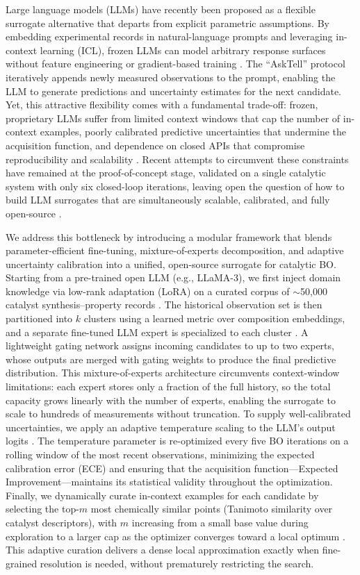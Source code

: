 \documentclass{article}
\begin{document}
Large language models (LLMs) have recently been proposed as a flexible surrogate alternative that departs from explicit parametric assumptions. By embedding experimental records in natural-language prompts and leveraging in-context learning (ICL), frozen LLMs can model arbitrary response surfaces without feature engineering or gradient-based training \cite{boiko2023autonomous, asktell2023llm}. The “AskTell” protocol iteratively appends newly measured observations to the prompt, enabling the LLM to generate predictions and uncertainty estimates for the next candidate. Yet, this attractive flexibility comes with a fundamental trade-off: frozen, proprietary LLMs suffer from limited context windows that cap the number of in-context examples, poorly calibrated predictive uncertainties that undermine the acquisition function, and dependence on closed APIs that compromise reproducibility and scalability \cite{boiko2023autonomous, liu2024lost}. Recent attempts to circumvent these constraints have remained at the proof-of-concept stage, validated on a single catalytic system with only six closed-loop iterations, leaving open the question of how to build LLM surrogates that are simultaneously scalable, calibrated, and fully open-source \cite{boiko2023autonomous}.

We address this bottleneck by introducing a modular framework that blends parameter-efficient fine-tuning, mixture-of-experts decomposition, and adaptive uncertainty calibration into a unified, open-source surrogate for catalytic BO. Starting from a pre-trained open LLM (e.g., LLaMA-3), we first inject domain knowledge via low-rank adaptation (LoRA) on a curated corpus of $\sim$50,000 catalyst synthesis–property records \cite{hu2022lora, taylor2022galactica}. The historical observation set is then partitioned into $k$ clusters using a learned metric over composition embeddings, and a separate fine-tuned LLM expert is specialized to each cluster \cite{jiang2024mixtral}. A lightweight gating network assigns incoming candidates to up to two experts, whose outputs are merged with gating weights to produce the final predictive distribution. This mixture-of-experts architecture circumvents context-window limitations: each expert stores only a fraction of the full history, so the total capacity grows linearly with the number of experts, enabling the surrogate to scale to hundreds of measurements without truncation. To supply well-calibrated uncertainties, we apply an adaptive temperature scaling to the LLM’s output logits \cite{guo2017calibration}. The temperature parameter is re-optimized every five BO iterations on a rolling window of the most recent observations, minimizing the expected calibration error (ECE) and ensuring that the acquisition function—Expected Improvement—maintains its statistical validity throughout the optimization. Finally, we dynamically curate in-context examples for each candidate by selecting the top-$m$ most chemically similar points (Tanimoto similarity over catalyst descriptors), with $m$ increasing from a small base value during exploration to a larger cap as the optimizer converges toward a local optimum \cite{willett2006similarity}. This adaptive curation delivers a dense local approximation exactly when fine-grained resolution is needed, without prematurely restricting the search.
\end{document}
